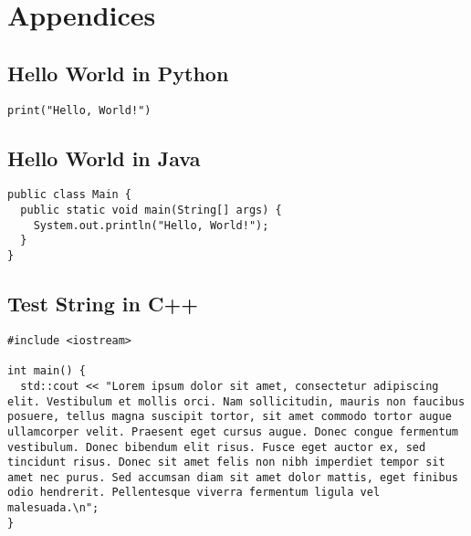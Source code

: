 \section{Appendices}


\subsection{Hello World in Python}

\begin{verbatim}
print("Hello, World!") 
\end{verbatim}

\subsection{Hello World in Java}

\begin{verbatim}
public class Main {
  public static void main(String[] args) {
    System.out.println("Hello, World!");
  }
}
\end{verbatim}

\subsection{Test String in C++}

\begin{verbatim}
#include <iostream>

int main() {
  std::cout << "Lorem ipsum dolor sit amet, consectetur adipiscing elit. Vestibulum et mollis orci. Nam sollicitudin, mauris non faucibus posuere, tellus magna suscipit tortor, sit amet commodo tortor augue ullamcorper velit. Praesent eget cursus augue. Donec congue fermentum vestibulum. Donec bibendum elit risus. Fusce eget auctor ex, sed tincidunt risus. Donec sit amet felis non nibh imperdiet tempor sit amet nec purus. Sed accumsan diam sit amet dolor mattis, eget finibus odio hendrerit. Pellentesque viverra fermentum ligula vel malesuada.\n";
}
\end{verbatim}
